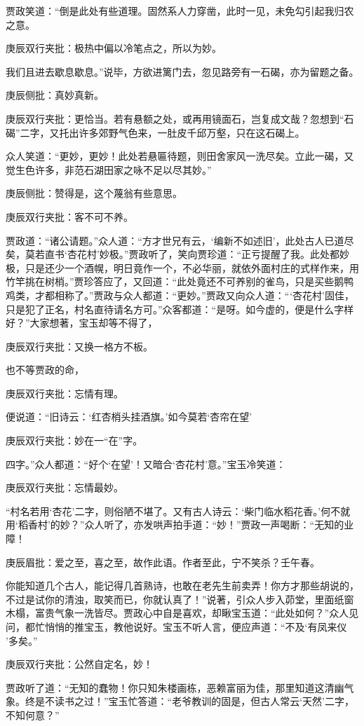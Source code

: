 \begin{parag}
    贾政笑道：“倒是此处有些道理。固然系人力穿凿，此时一见，未免勾引起我归农之意。\begin{note}庚辰双行夹批：极热中偏以冷笔点之，所以为妙。\end{note}我们且进去歇息歇息。”说毕，方欲进篱门去，忽见路旁有一石碣，亦为留题之备。\begin{note}庚辰侧批：真妙真新。\end{note}\begin{note}庚辰双行夹批：更恰当。若有悬额之处，或再用镜面石，岂复成文哉？忽想到“石碣”二字，又托出许多郊野气色来，一肚皮千邱万壑，只在这石碣上。\end{note}众人笑道：“更妙，更妙！此处若悬匾待题，则田舍家风一洗尽矣。立此一碣，又觉生色许多，非范石湖田家之咏不足以尽其妙。”\begin{note}庚辰侧批：赞得是，这个蔑翁有些意思。\end{note}\begin{note}庚辰双行夹批：客不可不养。\end{note}贾政道：“诸公请题。”众人道：“方才世兄有云，‘编新不如述旧’，此处古人已道尽矣，莫若直书‘杏花村’妙极。”贾政听了，笑向贾珍道：“正亏提醒了我。此处都妙极，只是还少一个酒幌，明日竟作一个，不必华丽，就依外面村庄的式样作来，用竹竿挑在树梢。”贾珍答应了，又回道：“此处竟还不可养别的雀鸟，只是买些鹅鸭鸡类，才都相称了。”贾政与众人都道：“更妙。”贾政又向众人道：“‘杏花村’固佳，只是犯了正名，村名直待请名方可。”众客都道：“是呀。如今虚的，便是什么字样好？”大家想著，宝玉却等不得了，\begin{note}庚辰双行夹批：又换一格方不板。\end{note}也不等贾政的命，\begin{note}庚辰双行夹批：忘情有理。\end{note}便说道：“旧诗云：‘红杏梢头挂酒旗。’如今莫若‘杏帘在望’\begin{note}庚辰双行夹批：妙在一“在”字。\end{note}四字。”众人都道：“好个‘在望’！又暗合‘杏花村’意。”宝玉冷笑道：\begin{note}庚辰双行夹批：忘情最妙。\end{note}“村名若用‘杏花’二字，则俗陋不堪了。又有古人诗云：‘柴门临水稻花香。’何不就用‘稻香村’的妙？”众人听了，亦发哄声拍手道：“妙！”贾政一声喝断：“无知的业障！\begin{note}庚辰眉批：爱之至，喜之至，故作此语。作者至此，宁不笑杀？壬午春。\end{note}你能知道几个古人，能记得几首熟诗，也敢在老先生前卖弄！你方才那些胡说的，不过是试你的清浊，取笑而已，你就认真了！”说著，引众人步入茆堂，里面纸窗木榻，富贵气象一洗皆尽。贾政心中自是喜欢，却瞅宝玉道：“此处如何？”众人见问，都忙悄悄的推宝玉，教他说好。宝玉不听人言，便应声道：“不及‘有凤来仪 ’多矣。”\begin{note}庚辰双行夹批：公然自定名，妙！\end{note}贾政听了道：“无知的蠢物！你只知朱楼画栋，恶赖富丽为佳，那里知道这清幽气象。终是不读书之过！”宝玉忙答道：“老爷教训的固是，但古人常云‘天然’二字，不知何意？”
\end{parag}


